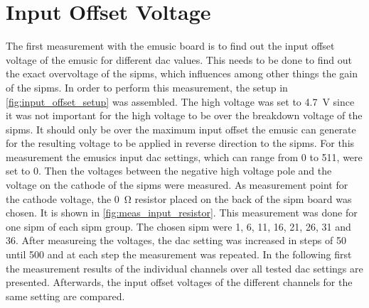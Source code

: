 




\section{Input Offset Voltage}
The first measurement with the \ac{emusic} board is to find out the input offset voltage of the \ac{emusic} for different \ac{dac} values.
This needs to be done to find out the exact overvoltage of the \acp{sipm}, which influences among other things the gain of the \acp{sipm}.
In order to perform this measurement, the setup in \autoref{fig:input_offset_setup} was assembled.
The high voltage was set to \SI{4.7}{\volt} since it was not important for the high voltage to be over the breakdown voltage of the \acp{sipm}.
It should only be over the maximum input offset the \ac{emusic} can generate for the resulting voltage to be applied in reverse direction to the \acp{sipm}.
For this measurement the \ac{emusic}s input \ac{dac} settings, which can range from 0 to 511, were set to 0.
Then the voltages between the negative high voltage pole and the voltage on the cathode of the \acp{sipm} were measured.
As measurement point for the cathode voltage, the \SI{0}{\ohm} resistor placed on the back of the \ac{sipm} board was chosen.
It is shown in \autoref{fig:meas_input_resistor}.
This measurement was done for one \ac{sipm} of each \ac{sipm} group.
The chosen \ac{sipm} were 1, 6, 11, 16, 21, 26, 31 and 36.
After measureing the voltages, the \ac{dac} setting was increased in steps of \SI{50}{\dacu} until \SI{500}{\dacu} and at each step the measurement was repeated.
In the following first the measurement results of the individual channels over all tested \ac{dac} settings are presented.
Afterwards, the input offset voltages of the different channels for the same setting are compared.

